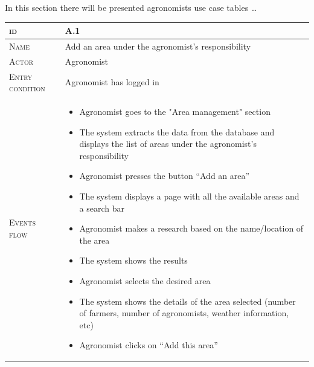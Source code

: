 In this section there will be presented agronomists use case tables \ldots

\begin{table}[H]
    \centering
    \begin{tabular}[c]{|l|p{}|}
        \hline %
    	\textsc{id}                 &   A.1\\
    	\hline %

    	\textsc{Name}               &   Add an area under the agronomist's responsibility\\
    	\hline %
    	\textsc{Actor}             &   Agronomist\\
    	\hline %
    	\textsc{Entry condition}   &   Agronomist has logged in\\
    	\hline %
    	\textsc{Events flow}         &   %
            	                        \begin{itemize}
                                    	    \item Agronomist goes to the "Area management" section
                                    	    \item The system extracts the data from the database and displays the list of areas under the agronomist's responsibility
                                    	    \item Agronomist presses the button “Add an area”
                                    		\item The system displays a page with all the available areas and a search bar
                                    		\item Agronomist makes a research based on the name/location of the area
                                    		\item The system shows the results
                                    		\item Agronomist selects the desired area
                                    		\item The system shows the details of the area selected (number of farmers, number of agronomists, weather information, etc)
                                    		\item Agronomist clicks on “Add this area”

\end{itemize}
\end{tabular}
\end{table}
